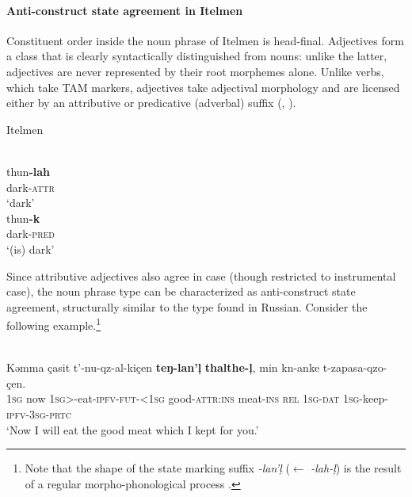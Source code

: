 \paragraph*{Anti\hyp{}construct state agreement in Itelmen}
\label{itelmen synchr}
Constituent order inside the noun phrase of Itelmen is head-final. Adjectives form a class that is clearly syntactically distinguished from nouns: unlike the latter, adjectives are never represented by their root morphemes alone. Unlike verbs, which take TAM markers, adjectives take adjectival morphology and are licensed either by an attributive or predicative (adverbal) suffix (\citealt{volodin1997}, \citealt[54]{georg-etal1999}).

\newpage 
\begin{exe}
\ex
\label{itelmen ex}
{\rm Itelmen \citep{volodin1997}} 
\begin{xlist}
\\
\gll	thun\textbf{-lah}\\
	dark-\textsc{attr}\\
\glt	‘dark’
\\
\gll	thun\textbf{-k}\\
	dark-\textsc{pred}\\
\glt	‘(is) dark’
\end{xlist}
\end{exe}
Since attributive adjectives also agree in case (though restricted to instrumental case), the noun phrase type can be characterized as anti\hyp{}construct state agreement, structurally similar to the type found in Russian. Consider the following example.\footnote{Note that the shape of the state marking suffix \textit{-lan'ļ} ($\leftarrow$ \textit{-lah-ļ}) is the result of a regular morpho-phonological process \citep{georg-etal1999}.}
\begin{exe}
\\
\gll	Kəmma çasit t'-nu-qz-al-kiçen \textbf{teŋ-lan'ļ} \textbf{thalthe-ļ}, min kn-anke t-zapasa-qzo-çen.\\
	\textsc{1sg} now \textsc{1sg}>-eat-\textsc{ipfv-fut-<1sg} good-\textsc{attr:ins} meat-\textsc{ins} \textsc{rel} \textsc{1sg-dat} \textsc{1sg}-keep-\textsc{ipfv-3sg-prtc}\\
\glt	‘Now I will eat the good meat which I kept for you.’
\end{exe}

